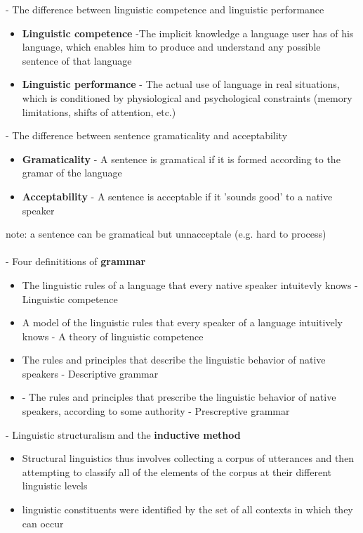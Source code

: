 \documentclass[11pt]{article}
\newenvironment{itemise}{
\begin{itemize}
  \setlength{\itemsep}{1pt}
  \setlength{\parskip}{0pt}
  \setlength{\parsep}{0pt}
}{\end{itemize}}
\begin{document}
- The difference between linguistic competence and linguistic performance
\begin{itemise}
 \item \textbf{Linguistic competence} -The implicit knowledge a language user has of his language, which enables him to produce and understand any possible sentence of that language
 \item \textbf{Linguistic performance} - The actual use of language in real situations, which is conditioned by physiological and psychological constraints (memory limitations, shifts of attention, etc.)
\end{itemise}
- The difference between sentence gramaticality and acceptability
\begin{itemise}
 \item \textbf{Gramaticality} - A sentence is gramatical if it is formed according to the gramar of the language
\item \textbf{Acceptability} - A sentence is acceptable if it 'sounds good' to a native speaker
\end{itemise}
note: a sentence can be gramatical but unnacceptale (e.g. hard to process)
\\\\
- Four definititions of \textbf{grammar}
\begin{itemise}
 \item The linguistic rules of a language that every native speaker intuitevly knows - Linguistic competence
\item A model of the linguistic rules that every speaker of a language intuitively knows - A theory of linguistic competence 
\item The rules and principles that describe the linguistic behavior of native speakers - Descriptive grammar
\item - The rules and principles that prescribe the linguistic behavior of native speakers, according to some authority - Prescreptive grammar
\end{itemise}
- Linguistic structuralism and the \textbf{inductive method} 
\begin{itemise}
 \item Structural linguistics thus involves collecting a corpus of utterances and then attempting to classify all of the elements of the corpus at their different linguistic levels
\item linguistic constituents were identified by the set of all contexts in which they can occur
\end{itemise}
\end{document}
